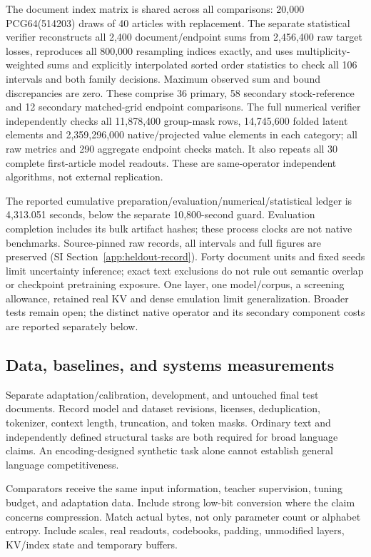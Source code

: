 \documentclass[11pt]{article}
\begin{document}
The document index matrix is shared across all comparisons: 20,000
PCG64(514203) draws of 40 articles with replacement. The separate statistical
verifier reconstructs all 2,400 document/endpoint sums from 2,456,400 raw
target losses, reproduces all 800,000 resampling indices exactly, and uses
multiplicity-weighted sums and explicitly interpolated sorted order statistics
to check all 106 intervals and both family decisions. Maximum observed sum
and bound discrepancies are zero. These comprise 36 primary, 58 secondary
stock-reference and 12 secondary matched-grid endpoint comparisons.
The full numerical verifier independently checks all 11,878,400 group-mask
rows, 14,745,600 folded latent elements and 2,359,296,000 native/projected
value elements in each category; all raw metrics and 290 aggregate endpoint
checks match. It also repeats all 30 complete first-article model readouts.
These are same-operator independent algorithms, not external replication.

The reported cumulative preparation/evaluation/numerical/statistical ledger
is 4,313.051 seconds, below the separate 10,800-second guard. Evaluation
completion includes its bulk artifact hashes; these process clocks are not
native benchmarks. Source-pinned raw records, all intervals and full figures
are preserved (SI Section~\ref{app:heldout-record}). Forty document units and
fixed seeds limit uncertainty inference; exact text exclusions do not rule
out semantic overlap or checkpoint pretraining exposure. One layer, one
model/corpus, a screening allowance, retained real KV and dense emulation
limit generalization. Broader tests remain open; the distinct native operator
and its secondary component costs are reported separately below.

\subsection{Data, baselines, and systems measurements}

Separate adaptation/calibration, development, and untouched final test documents.
Record model and dataset revisions, licenses, deduplication, tokenizer,
context length, truncation, and token masks. Ordinary text and independently
defined structural tasks are both required for broad language claims.
An encoding-designed synthetic task alone cannot establish general language
competitiveness.

Comparators receive the same input information, teacher supervision, tuning
budget, and adaptation data. Include strong low-bit conversion where the
claim concerns compression. Match actual bytes, not only parameter count or
alphabet entropy. Include scales, real readouts, codebooks, padding,
unmodified layers, KV/index state and temporary buffers.
\end{document}
